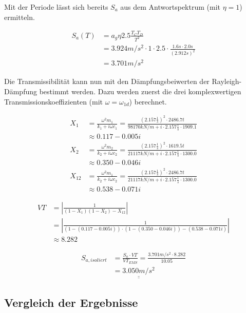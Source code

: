 Mit der Periode lässt sich bereits $S_a$ aus dem Antwortspektrum (mit $\eta = 1$) ermitteln.

\begin{align*}
S_a(T) &= a_g \eta 2.5 \frac{T_C T_D}{T^2}\\
       &= 3.924 m/s^2 \cdot 1 \cdot 2.5 \cdot \frac{1.6 s \cdot 2.0 s}{(2.912 s)^2}\\
       &= 3.701 m/s^2
\end{align*}

Die Transmissibilität kann nun mit den Dämpfungsbeiwerten der Rayleigh-Dämpfung bestimmt werden. Dazu werden zuerst die drei komplexwertigen Transmissionskoeffizienten (mit $\omega = \omega_{1d}$) berechnet.

\begin{align*}
X_1 &= \frac{\omega^2 m_1}{k_1 + i \omega c_1} = \frac{(2.157 \frac{1}{s})^2 \cdot 2486.7 t}{98170kN/m + i \cdot 2.157 \frac{1}{s} \cdot 1909.1}\\
    &\approx 0.117 - 0.005i\\[2em]
X_2 &= \frac{\omega^2 m_2}{k_2 + i \omega c_2} = \frac{(2.157 \frac{1}{s})^2 \cdot 1619.5 t}{21117kN/m + i \cdot 2.157 \frac{1}{s} \cdot 1300.0}\\
    &\approx 0.350 - 0.046i\\[2em]
X_{12} &= \frac{\omega^2 m_1}{k_2 + i \omega c_2} = \frac{(2.157 \frac{1}{s})^2 \cdot 2486.7 t}{21117kN/m + i \cdot 2.157 \frac{1}{s} \cdot 1300.0}\\
    &\approx 0.538 - 0.071i
\end{align*}

\begin{align*}
VT &= \left\lvert \frac{1}{(1 - X_1)(1 - X_2) - X_{12}} \right\rvert\\
   &= \left\lvert \frac{1}{(1 - (0.117 - 0.005i)) \cdot (1 - (0.350 - 0.046i)) - (0.538 - 0.071i)} \right\rvert\\
   &\approx 8.282
\end{align*}

\begin{align*}
S_{a,isoliert} &= \frac{S_a \cdot VT}{VT_{EMS}} = \frac{3.701 m/s^2 \cdot 8.282}{10.05}\\
               &= \underline{\underline{3.050 m/s^2}}
\end{align*}

\subsection{Vergleich der Ergebnisse}


